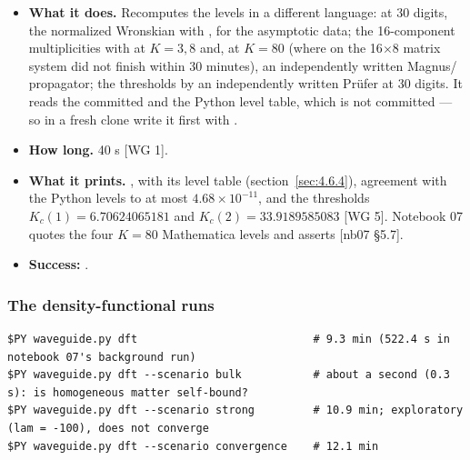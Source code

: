 \begin{itemize}
  \item \textbf{What it does.} Recomputes the levels in a different language:  at 30 digits, the normalized Wronskian with ,  for the asymptotic data; the 16-component multiplicities with  at $K = 3, 8$ and, at $K = 80$ (where  on the 16$\times$8 matrix system did not finish within 30 minutes), an independently written Magnus/ propagator; the thresholds by an independently written Prüfer  at 30 digits. It reads the committed  and the Python level table, which is not committed --- so in a fresh clone write it first with .
  \item \textbf{How long.} 40 s [WG 1].
  \item \textbf{What it prints.} , with its level table (section~\ref{sec:4.6.4}), agreement with the Python levels to at most $4.68\times10^{-11}$, and the thresholds $K_{c}(1) = 6.70624065181$ and $K_{c}(2) = 33.9189585083$ [WG 5]. Notebook 07 quotes the four $K = 80$ Mathematica levels and asserts  [nb07 \S{}5.7].
  \item \textbf{Success:} .
\end{itemize}

\subsubsection{The density-functional runs}
\label{sec:6.6.5}

\begin{Verbatim}
$PY waveguide.py dft                           # 9.3 min (522.4 s in notebook 07's background run)
$PY waveguide.py dft --scenario bulk           # about a second (0.3 s): is homogeneous matter self-bound?
$PY waveguide.py dft --scenario strong         # 10.9 min; exploratory (lam = -100), does not converge
$PY waveguide.py dft --scenario convergence    # 12.1 min
\end{Verbatim}

